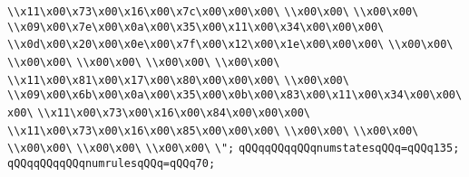 \verb|\\x11\x00\x73\x00\x16\x00\x7c\x00\x00\x00\|\newline
\verb|\\x00\x00\|\newline
\verb|\\x00\x00\|\newline
\verb|\\x09\x00\x7e\x00\x0a\x00\x35\x00\x11\x00\x34\x00\x00\x00\|\newline
\verb|\\x0d\x00\x20\x00\x0e\x00\x7f\x00\x12\x00\x1e\x00\x00\x00\|\newline
\verb|\\x00\x00\|\newline
\verb|\\x00\x00\|\newline
\verb|\\x00\x00\|\newline
\verb|\\x00\x00\|\newline
\verb|\\x00\x00\|\newline
\verb|\\x11\x00\x81\x00\x17\x00\x80\x00\x00\x00\|\newline
\verb|\\x00\x00\|\newline
\verb|\\x09\x00\x6b\x00\x0a\x00\x35\x00\x0b\x00\x83\x00\x11\x00\x34\x00\x00\x00\|\newline
\verb|\\x11\x00\x73\x00\x16\x00\x84\x00\x00\x00\|\newline
\verb|\\x11\x00\x73\x00\x16\x00\x85\x00\x00\x00\|\newline
\verb|\\x00\x00\|\newline
\verb|\\x00\x00\|\newline
\verb|\\x00\x00\|\newline
\verb|\\x00\x00\|\newline
\verb|\\x00\x00\|\newline
\verb|\";|\newline
\verb|qQQqqQQqqQQqnumstatesqQQq=qQQq135;|\newline
\verb|qQQqqQQqqQQqnumrulesqQQq=qQQq70;|\newline
